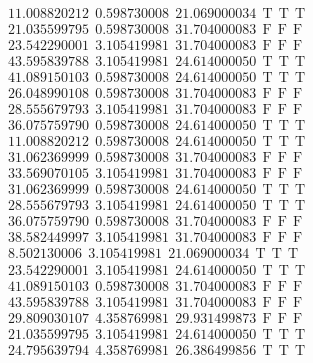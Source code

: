 \documentclass[10pt,a4paper]{article}
\begin{document}
\begin{itemize}
\begin{displaymath}
{\begin{aligned}
&11.008820212 ~~   0.598730008 ~~  21.069000034  ~~\mathrm{T  ~~ T  ~~ T } \\ 
&21.035599795 ~~   0.598730008 ~~  31.704000083  ~~\mathrm{F  ~~ F  ~~  F} \\ 
&23.542290001 ~~   3.105419981 ~~  31.704000083  ~~\mathrm{F  ~~ F  ~~  F} \\ 
&43.595839788 ~~   3.105419981 ~~  24.614000050  ~~\mathrm{T  ~~ T  ~~ T } \\ 
&41.089150103 ~~   0.598730008 ~~  24.614000050  ~~\mathrm{T  ~~ T  ~~ T } \\ 
&26.048990108 ~~   0.598730008 ~~  31.704000083  ~~\mathrm{F  ~~ F  ~~  F} \\ 
&28.555679793 ~~   3.105419981 ~~  31.704000083  ~~\mathrm{F  ~~ F  ~~  F} \\ 
&36.075759790 ~~   0.598730008 ~~  24.614000050  ~~\mathrm{T  ~~ T  ~~ T } \\ 
&11.008820212 ~~   0.598730008 ~~  24.614000050  ~~\mathrm{T  ~~ T  ~~ T } \\ 
&31.062369999 ~~   0.598730008 ~~  31.704000083  ~~\mathrm{F  ~~ F  ~~  F} \\ 
&33.569070105 ~~   3.105419981 ~~  31.704000083  ~~\mathrm{F  ~~ F  ~~  F} \\ 
&31.062369999 ~~   0.598730008 ~~  24.614000050  ~~\mathrm{T  ~~ T  ~~ T } \\ 
&28.555679793 ~~   3.105419981 ~~  24.614000050  ~~\mathrm{T  ~~ T  ~~ T } \\ 
&36.075759790 ~~   0.598730008 ~~  31.704000083  ~~\mathrm{F  ~~ F  ~~  F} \\ 
&38.582449997 ~~   3.105419981 ~~  31.704000083  ~~\mathrm{F  ~~ F  ~~  F} \\ 
& 8.502130006 ~~   3.105419981 ~~  21.069000034  ~~\mathrm{T  ~~ T  ~~ T } \\ 
&23.542290001 ~~   3.105419981 ~~  24.614000050  ~~\mathrm{T  ~~ T  ~~ T } \\ 
&41.089150103 ~~   0.598730008 ~~  31.704000083  ~~\mathrm{F  ~~ F  ~~  F} \\ 
&43.595839788 ~~   3.105419981 ~~  31.704000083  ~~\mathrm{F  ~~ F  ~~  F} \\ 
&29.809030107 ~~   4.358769981 ~~  29.931499873  ~~\mathrm{F  ~~ F  ~~  F} \\
&21.035599795 ~~   3.105419981 ~~  24.614000050  ~~\mathrm{T  ~~ T  ~~ T } \\
&24.795639794 ~~   4.358769981 ~~  26.386499856  ~~\mathrm{T  ~~ T  ~~ T } \\

\end{aligned}}
\end{displaymath}
\end{itemize}
\end{document}
